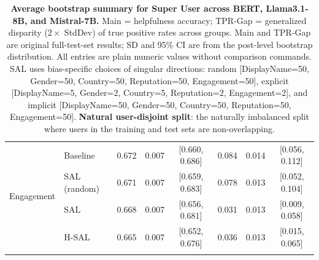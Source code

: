 \begin{table}[th!]
{\begin{tabular}{ll c c c c c c}
\multirow{4}{*}{Engagement} & Baseline & 0.672 & 0.007 & [0.660, 0.686] & 0.084 & 0.014 & [0.056, 0.112] \\
\addlinespace[4pt]
& SAL (random) & 0.671 & 0.007 & [0.659, 0.683] & 0.078 & 0.013 & [0.052, 0.104] \\
\addlinespace[4pt]
& SAL & 0.668 & 0.007 & [0.656, 0.681] & 0.031 & 0.013 & [0.009, 0.058] \\
\addlinespace[4pt]
& H-SAL & 0.665 & 0.007 & [0.652, 0.676] & 0.036 & 0.013 & [0.015, 0.065] \\
\addlinespace[4pt]
\bottomrule
\end{tabular}
}
\caption{\textbf{Average bootstrap summary for Super User across BERT, Llama3.1-8B, and Mistral-7B.}
Main = helpfulness accuracy; TPR-Gap = generalized disparity ($2 \times$ StdDev) of true positive rates across groups.
Main and TPR-Gap are original full-test-set results; SD and 95\% CI are from the post-level bootstrap distribution.
All entries are plain numeric values without comparison commands.
SAL uses bias-specific choices of singular directions: random [DisplayName=50, Gender=50, Country=50, Reputation=50, Engagement=50], explicit [DisplayName=5, Gender=2, Country=5, Reputation=2, Engagement=2], and implicit [DisplayName=50, Gender=50, Country=50, Reputation=50, Engagement=50].
\textbf{Natural user-disjoint split}: the naturally imbalanced split where users in the training and test sets are non-overlapping.}
\label{tab:ste-bootstrap-summary-plain-superuser-natural-disjoint}
\end{table}
